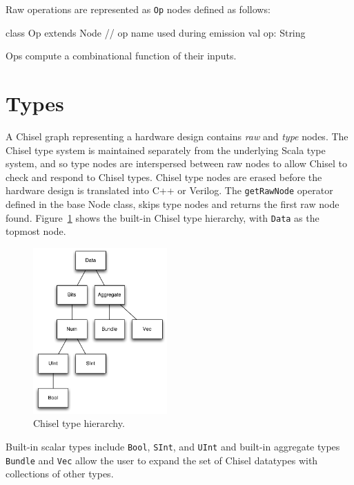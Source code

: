 \documentclass[10pt,twocolumn]{article}
\def\code#1{{\small\tt #1}}
\begin{document}
Raw operations are represented as \code{Op} nodes defined as follows:

\begin{scala}
class Op extends Node {
  // op name used during emission
  val op: String
}
\end{scala}

\noindent
Ops compute a combinational function of their inputs.

\section{Types}
\label{sec:types}

A Chisel graph representing a hardware design contains {\em raw} and
{\em type} nodes.  The Chisel type system is maintained separately
from the underlying Scala type system, and so type nodes are
interspersed between raw nodes to allow Chisel to check and respond to
Chisel types.  Chisel type nodes are erased before the hardware design
is translated into C++ or Verilog.  The \code{getRawNode} operator
defined in the base Node class, skips type nodes and returns the first
raw node found.  Figure~\ref{fig:type-hierarchy} shows the built-in
Chisel type hierarchy, with \code{Data} as the topmost node.

\begin{figure}[h]
\centering
\includegraphics[height=2.5in]{figs/type-hierarchy.pdf}
\caption{Chisel type hierarchy.}
\label{fig:type-hierarchy}
\end{figure}

\noindent
Built-in scalar types include \code{Bool}, \code{SInt},
and \code{UInt} and built-in aggregate types \code{Bundle} and
\code{Vec} allow the user to expand the set of Chisel datatypes with
collections of other types.
\end{document}
